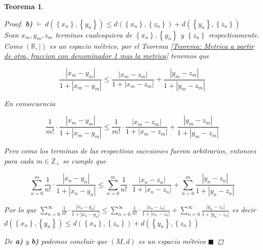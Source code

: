 \documentclass[oneside]{book} %
\theoremstyle{Teorema}
\newtheorem{Teorema}[Definicion]{Teorema}
\theoremstyle{Ejemplos}
\theoremstyle{[Obs]}
\newcommand{\abs}[1]{\left|#1\right|} %
\newcommand{\absSymbol}{\left|\right.} %
\renewcommand{\{}{\left\lbrace} %
\renewcommand{\}}{\right\rbrace} %
\newcommand{\R}{\mathbb{R}} %
\newcommand{\Z}{\mathbb{Z}} %
\renewcommand{\qed}{$\blacksquare$} %
\newcommand{\pd}{$\vdash\ $} %
\begin{document}
\begin{Teorema}
\begin{proof}
					\textbf{b)} \pd $d(\{ x_n \}, \{ y_n \}) \leq d(\{ x_n \}, \{ z_n \}) + d(\{ y_n \}, \{ z_n \})$ \\
					Sean $x_m, y_m, z_m$ terminos cualesquiera de $\{ x_n \}, \{ y_n \}$ y $\{ z_n \}$ respectivamente. Como $(\R, \absSymbol)$ es un espacio métrico, por el Teorema \ref{Teorema: Metrica a partir de otra, fraccion con denominador 1 mas la metrica} tenemos que 

					\[ \frac{\abs{x_m - y_m}}{1 + \abs{x_m - y_m}} \leq \frac{\abs{x_m - z_m}}{1 + \abs{x_m - z_m}} + \frac{\abs{y_m - z_m}}{1 + \abs{y_m - z_m}} \]

					En consecuencia

					\[ \frac{1}{m!} \cdot \frac{\abs{x_m - y_m}}{1 + \abs{x_m - y_m}} \leq \frac{1}{m!} \cdot \frac{\abs{x_m - z_m}}{1 + \abs{x_m - z_m}} + \frac{\abs{y_m - z_m}}{1 + \abs{y_m - z_m}} \]

					Pero como los terminos de las respectivas sucesiones fueron arbitrarios, entonces para cada $m \in \Z_{+}$ se cumple que 

					\[ \sum_{n = 0}^{m} \frac{1}{n!} \cdot \frac{\abs{x_n - y_n}}{1 + \abs{x_n - y_n}} \leq \sum_{n = 0}^{m} \frac{1}{n!} \cdot \frac{\abs{x_n - z_n}}{1 + \abs{x_n - z_n}} + \sum_{n = 0}^{m} \frac{\abs{y_n - z_n}}{1 + \abs{y_n - z_n}} \]

					Por lo que $\sum_{n = 0}^{\infty} \frac{1}{n!} \cdot \frac{\abs{x_n - y_n}}{1 + \abs{x_n - y_n}} \leq \sum_{n = 0}^{\infty} \frac{1}{n!} \cdot \frac{\abs{x_n - z_n}}{1 + \abs{x_n - z_n}} + \sum_{n = 0}^{\infty} \frac{\abs{y_n - z_n}}{1 + \abs{y_n - z_n}}$ es decir $d(\{ x_n \}, \{ y_n \}) \leq d(\{ x_n \}, \{ z_n \}) + d(\{ y_n \}, \{ z_n \})$

					De \textbf{a)} y \textbf{b)} podemos concluir que $(M, d)$ es un espacio métrico \qed

				\end{proof}

			\end{Teorema}
\end{document}
